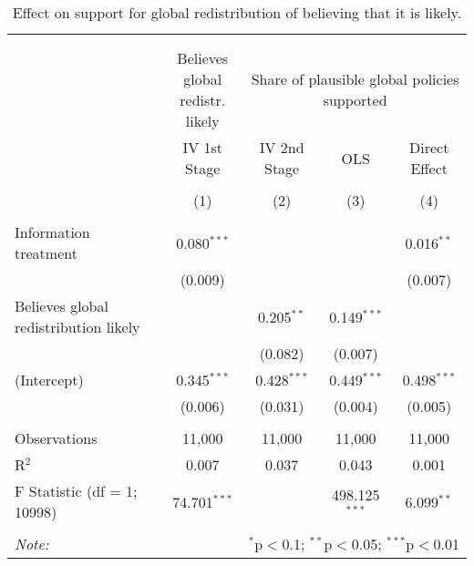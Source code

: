 
\begin{table}[!htbp] \centering 
  \caption{Effect on support for global redistribution of believing that it is likely.} 
  \label{tab:iv} 
\begin{tabular}{@{\extracolsep{5pt}}lcccc} 
\\[-1.8ex]\hline 
\hline \\[-1.8ex] 
\\[-1.8ex] & \makecell{Believes global\\redistr. likely} & \multicolumn{3}{c}{Share of plausible global policies supported} \\ 
 & IV 1st Stage & IV 2nd Stage & OLS & Direct Effect \\ 
\\[-1.8ex] & (1) & (2) & (3) & (4)\\ 
\hline \\[-1.8ex] 
 Information treatment & 0.080$^{***}$ &  &  & 0.016$^{**}$ \\ 
  & (0.009) &  &  & (0.007) \\ 
  Believes global redistribution likely &  & 0.205$^{**}$ & 0.149$^{***}$ &  \\ 
  &  & (0.082) & (0.007) &  \\ 
  (Intercept) & 0.345$^{***}$ & 0.428$^{***}$ & 0.449$^{***}$ & 0.498$^{***}$ \\ 
  & (0.006) & (0.031) & (0.004) & (0.005) \\ 
 \hline \\[-1.8ex] 
Observations & 11,000 & 11,000 & 11,000 & 11,000 \\ 
R$^{2}$ & 0.007 & 0.037 & 0.043 & 0.001 \\ 
F Statistic (df = 1; 10998) & 74.701$^{***}$ &  & 498.125$^{***}$ & 6.099$^{**}$ \\ 
\hline 
\hline \\[-1.8ex] 
\textit{Note:}  & \multicolumn{4}{r}{$^{*}$p$<$0.1; $^{**}$p$<$0.05; $^{***}$p$<$0.01} \\ 
\end{tabular} 
\end{table} 
